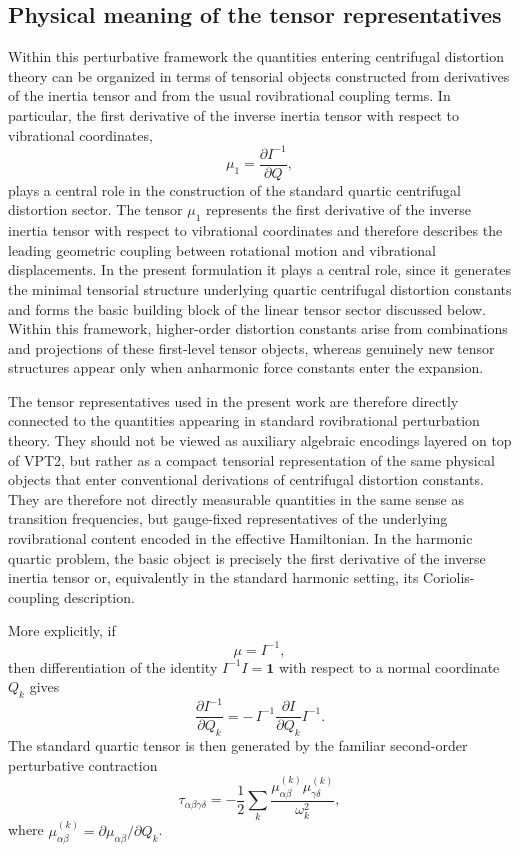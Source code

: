 \documentclass[journal=jacsat,manuscript=article]{achemso}
\begin{document}
\subsection{Physical meaning of the tensor representatives}

Within this perturbative framework the quantities entering centrifugal
distortion theory can be organized in terms of tensorial objects
constructed from derivatives of the inertia tensor and from the usual
rovibrational coupling terms. In particular, the first derivative of
the inverse inertia tensor with respect to vibrational coordinates,
\begin{equation}
\mu_1 = \frac{\partial I^{-1}}{\partial Q},
\end{equation}
plays a central role in the construction of the standard quartic
centrifugal distortion sector.
The tensor $\mu_1$ represents the first derivative of the inverse
inertia tensor with respect to vibrational coordinates and therefore
describes the leading geometric coupling between rotational motion and
vibrational displacements. In the present formulation it plays a
central role, since it generates the minimal tensorial structure
underlying quartic centrifugal distortion constants and forms the basic
building block of the linear tensor sector discussed below. Within
this framework, higher-order distortion constants arise from
combinations and projections of these first-level tensor objects,
whereas genuinely new tensor structures appear only when anharmonic
force constants enter the expansion.

The tensor representatives used in the present work are therefore
directly connected to the quantities appearing in standard
rovibrational perturbation theory. They should not be viewed as
auxiliary algebraic encodings layered on top of VPT2, but rather as
a compact tensorial representation of the same physical objects that
enter conventional derivations of centrifugal distortion constants.
They are therefore not directly measurable quantities in the same sense
as transition frequencies, but gauge-fixed representatives of the
underlying rovibrational content encoded in the effective Hamiltonian.
In the harmonic quartic problem, the basic object is precisely the
first derivative of the inverse inertia tensor or, equivalently in the
standard harmonic setting, its Coriolis-coupling description.

More explicitly, if
\begin{equation}
\mu = I^{-1},
\end{equation}
then differentiation of the identity $I^{-1}I=\mathbf 1$ with respect to
a normal coordinate $Q_k$ gives
\begin{equation}
\frac{\partial I^{-1}}{\partial Q_k}
=
-\,I^{-1}\frac{\partial I}{\partial Q_k}I^{-1}.
\end{equation}
The standard quartic tensor is then generated by the familiar
second-order perturbative contraction
\begin{equation}
\tau_{\alpha\beta\gamma\delta}
=
-\frac12\sum_k
\frac{
\mu_{\alpha\beta}^{(k)}\mu_{\gamma\delta}^{(k)}
}{\omega_k^2},
\end{equation}
where $\mu_{\alpha\beta}^{(k)}=\partial\mu_{\alpha\beta}/\partial Q_k$.
\end{document}
